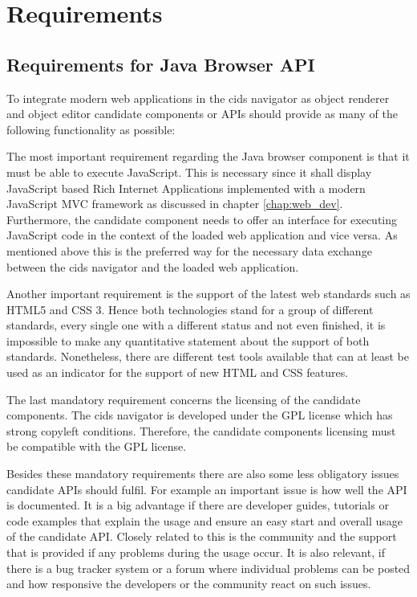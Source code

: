 \section{Requirements}\label{chap:requirements}
\subsection{Requirements for Java Browser API}\label{chap:conception_section:req-broser-api}

To integrate modern web applications in the cids navigator as object renderer and object editor candidate components or APIs should provide as many of the following functionality as possible:

The most important requirement regarding the Java browser component is that it must be able to execute JavaScript.
This is necessary since it shall display JavaScript based Rich Internet Applications implemented with a modern JavaScript MVC framework as discussed in chapter \ref{chap:web_dev}.
Furthermore, the candidate component needs to offer an interface for executing JavaScript code in the context of the loaded web application and vice versa.
As mentioned above this is the preferred way for the necessary data exchange between the cids navigator and the  loaded web application.

Another important requirement is the support of the latest web standards such as HTML5 and CSS 3.
Hence both technologies stand for a group of different standards, every single one with a different status and not even finished, it is impossible to make any quantitative statement about the support of both standards.
Nonetheless, there are different test tools available that can at least be used as an indicator for the support of new HTML and CSS features.

The last mandatory requirement concerns the licensing of the candidate components.
The cids navigator is developed under the GPL license which has strong copyleft conditions.
Therefore, the candidate components licensing must be compatible with the GPL license.

Besides these mandatory requirements there are also some less obligatory issues candidate APIs should fulfil.
For example an important issue is how well the API is documented.
It is a big advantage if there are developer guides, tutorials or code examples that explain the usage and ensure an easy start and overall usage of the candidate API.
Closely related to this is the community and the support that is provided if any problems during the usage occur.
It is also relevant, if there is a bug tracker system or a forum where individual problems can be posted and how responsive the developers or the community react on such issues.


